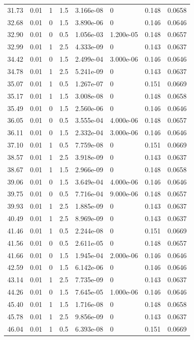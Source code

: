 \documentclass[preview]{standalone}
\begin{document}
{{{\begin{tabular}{L{1.2cm}C{1.2cm} C{0.3cm}C{0.5cm} C{1.4cm}C{1.4cm} C{1.4cm}C{1.4cm}}
  31.73  &  0.01  & 1     & 1.5 &  3.166e-08  & 0  & 0.148 &  0.0658   \\ 
  32.68  &  0.01  & 0     & 1.5 &  3.890e-06  & 0  & 0.146 &  0.0646   \\ 
  32.90  &  0.01  & 0     & 0.5 &  1.056e-03  & 1.200e-05  & 0.148 &  0.0657   \\ 
  32.99  &  0.01  & 1     & 2.5 &  4.333e-09  & 0  & 0.143 &  0.0637   \\ 
  34.42  &  0.01  & 0     & 1.5 &  2.499e-04  & 3.000e-06  & 0.146 &  0.0646   \\ 
  34.78  &  0.01  & 1     & 2.5 &  5.241e-09  & 0  & 0.143 &  0.0637   \\ 
  35.07  &  0.01  & 1     & 0.5 &  1.267e-07  & 0  & 0.151 &  0.0669   \\ 
  35.17  &  0.01  & 1     & 1.5 &  3.008e-08  & 0  & 0.148 &  0.0658   \\ 
  35.49  &  0.01  & 0     & 1.5 &  2.560e-06  & 0  & 0.146 &  0.0646   \\ 
  36.05  &  0.01  & 0     & 0.5 &  3.555e-04  & 4.000e-06  & 0.148 &  0.0657   \\ 
  36.11  &  0.01  & 0     & 1.5 &  2.332e-04  & 3.000e-06  & 0.146 &  0.0646   \\ 
  37.10  &  0.01  & 1     & 0.5 &  7.759e-08  & 0  & 0.151 &  0.0669   \\ 
  38.57  &  0.01  & 1     & 2.5 &  3.918e-09  & 0  & 0.143 &  0.0637   \\ 
  38.67  &  0.01  & 1     & 1.5 &  2.966e-09  & 0  & 0.148 &  0.0658   \\ 
  39.06  &  0.01  & 0     & 1.5 &  3.649e-04  & 4.000e-06  & 0.146 &  0.0646   \\ 
  39.75  &  0.01  & 0     & 0.5 &  7.716e-04  & 9.000e-06  & 0.148 &  0.0657   \\ 
  39.93  &  0.01  & 1     & 2.5 &  1.885e-09  & 0  & 0.143 &  0.0637   \\ 
  40.49  &  0.01  & 1     & 2.5 &  8.969e-09  & 0  & 0.143 &  0.0637   \\ 
  41.46  &  0.01  & 1     & 0.5 &  2.244e-08  & 0  & 0.151 &  0.0669   \\ 
  41.56  &  0.01  & 0     & 0.5 &  2.611e-05  & 0  & 0.148 &  0.0657   \\ 
  41.66  &  0.01  & 0     & 1.5 &  1.945e-04  & 2.000e-06  & 0.146 &  0.0646   \\ 
  42.59  &  0.01  & 0     & 1.5 &  6.142e-06  & 0  & 0.146 &  0.0646   \\ 
  43.14  &  0.01  & 1     & 2.5 &  7.735e-09  & 0  & 0.143 &  0.0637   \\ 
  44.26  &  0.01  & 0     & 1.5 &  7.645e-05  & 1.000e-06  & 0.146 &  0.0646   \\ 
  45.40  &  0.01  & 1     & 1.5 &  1.716e-08  & 0  & 0.148 &  0.0658   \\ 
  45.78  &  0.01  & 1     & 2.5 &  9.856e-09  & 0  & 0.143 &  0.0637   \\ 
  46.04  &  0.01  & 1     & 0.5 &  6.393e-08  & 0  & 0.151 &  0.0669   \\ 
\hline 
\end{tabular} 

}}}
\end{document}
